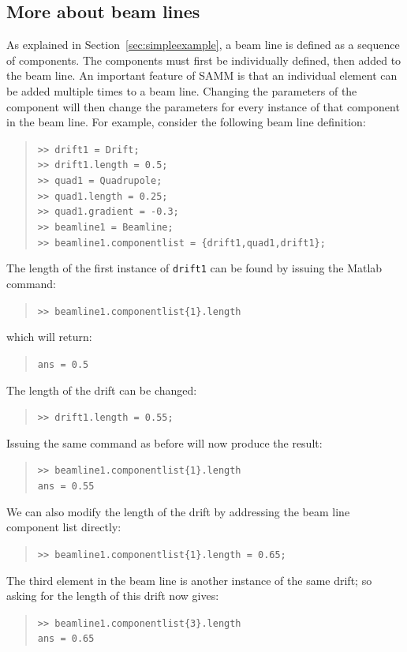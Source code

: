 \documentclass[11pt,twoside,a4paper]{article}
\begin{document}
\subsection{More about beam lines\label{sec:settingupabeamline}}
As explained in Section~\ref{sec:simpleexample}, a beam line is defined as
a sequence of components.  The components must first be individually
defined, then added to the beam line.  An important feature of SAMM is
that an individual element can be added multiple times to a beam line.
Changing the parameters of the component will then change the parameters
for every instance of that component in the beam line.  For example,
consider the following beam line definition:
\begin{quote}
\texttt{>> drift1 = Drift; \\
>> drift1.length = 0.5; \\
>> quad1 = Quadrupole; \\
>> quad1.length = 0.25; \\
>> quad1.gradient = -0.3; \\
>> beamline1 = Beamline; \\
>> beamline1.componentlist = \{drift1,quad1,drift1\};}
\end{quote}
The length of the first instance of \texttt{drift1} can be found by
issuing the Matlab command:
\begin{quote}
\texttt{>> beamline1.componentlist\{1\}.length}
\end{quote}
which will return:
\begin{quote}
\texttt{ans = 0.5}
\end{quote}
The length of the drift can be changed:
\begin{quote}
\texttt{>> drift1.length = 0.55;}
\end{quote}
Issuing the same command as before will now produce the result:
\begin{quote}
\texttt{>> beamline1.componentlist\{1\}.length \\
ans = 0.55}
\end{quote}
We can also modify the length of the drift by addressing the beam line
component list directly:
\begin{quote}
\texttt{>> beamline1.componentlist\{1\}.length = 0.65;}
\end{quote}
The third element in the beam line is another instance of the same drift;
so asking for the length of this drift now gives:
\begin{quote} \texttt{>> beamline1.componentlist\{3\}.length \\
ans = 0.65}
\end{quote}
\end{document}

